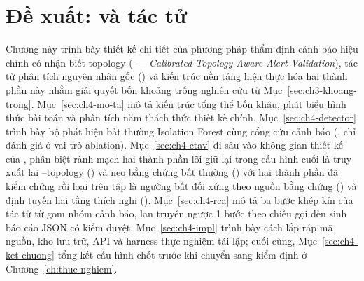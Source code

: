 %        
%        
%        
%        
%

\section{Đề xuất: \CTAV{} và tác tử }
\label{ch:de-xuat}

Chương này trình bày thiết kế chi tiết của phương pháp thẩm định cảnh báo hiệu chỉnh có nhận biết topology (\CTAV{} — \emph{Calibrated Topology-Aware Alert Validation}), tác tử phân tích nguyên nhân gốc () và kiến trúc nền tảng hiện thực hóa hai thành phần này nhằm giải quyết bốn khoảng trống nghiên cứu từ Mục~\ref{sec:ch3-khoang-trong}. Mục~\ref{sec:ch4-mo-ta} mô tả kiến trúc tổng thể bốn khâu, phát biểu hình thức bài toán và phân tích năm thách thức thiết kế chính. Mục~\ref{sec:ch4-detector} trình bày bộ phát hiện bất thường Isolation Forest cùng cổng cứu cảnh báo \textbf{} (, chỉ đánh giá ở vai trò ablation). Mục~\ref{sec:ch4-ctav} đi sâu vào không gian thiết kế của \CTAV{}, phân biệt rành mạch hai thành phần lõi giữ lại trong cấu hình cuối là truy xuất lai --topology (\textbf{}) và neo bằng chứng bất thường (\textbf{}) với hai thành phần đã kiểm chứng rồi loại trên tập  là ngưỡng bất đối xứng theo nguồn bằng chứng (\textbf{}) và định tuyến hai tầng thích nghi (\textbf{}). Mục~\ref{sec:ch4-rca} mô tả ba bước khép kín của tác tử  từ gom nhóm cảnh báo, lan truyền ngược 1 bước theo chiều gọi đến sinh báo cáo JSON có kiểm duyệt. Mục~\ref{sec:ch4-impl} trình bày cách lắp ráp mã nguồn, kho lưu trữ, API và harness thực nghiệm tái lập; cuối cùng, Mục~\ref{sec:ch4-ket-chuong} tổng kết cấu hình chốt trước khi chuyển sang kiểm định ở Chương~\ref{ch:thuc-nghiem}.

